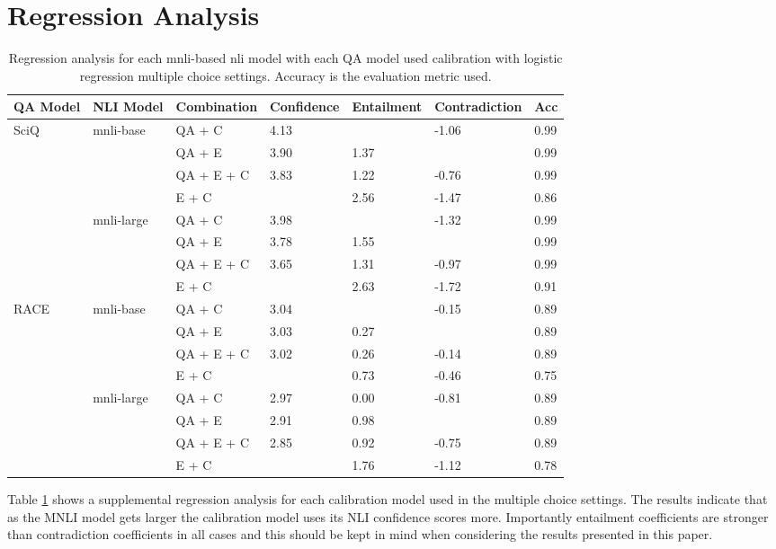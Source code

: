 \documentclass[11pt]{article}
\begin{document}
\section{Regression Analysis}
\begin{table}[]
\centering
\begin{tabular}{lllllll}
\hline
QA Model & NLI Model & Combination & Confidence & Entailment & Contradiction & Acc \\ \hline
SciQ & mnli-base & QA + C & 4.13 &  & -1.06 & 0.99 \\
 &  & QA + E & 3.90 & 1.37 &  & 0.99 \\
 &  & QA + E + C & 3.83 & 1.22 & -0.76 & 0.99 \\
 &  & E + C &  & 2.56 & -1.47 & 0.86 \\
 & mnli-large & QA + C & 3.98 &  & -1.32 & 0.99 \\
 &  & QA + E & 3.78 & 1.55 &  & 0.99 \\
 &  & QA + E + C & 3.65 & 1.31 & -0.97 & 0.99 \\
 &  & E + C &  & 2.63 & -1.72 & 0.91 \\
RACE & mnli-base & QA + C & 3.04 &  & -0.15 & 0.89 \\
 &  & QA + E & 3.03 & 0.27 &  & 0.89 \\
 &  & QA + E + C & 3.02 & 0.26 & -0.14 & 0.89 \\
 &  & E + C &  & 0.73 & -0.46 & 0.75 \\
 & mnli-large & QA + C & 2.97 & 0.00 & -0.81 & 0.89 \\
 &  & QA + E & 2.91 & 0.98 &  & 0.89 \\
 &  & QA + E + C & 2.85 & 0.92 & -0.75 & 0.89 \\
 &  & E + C &  & 1.76 & -1.12 & 0.78 \\ \hline
\end{tabular}
\caption{Regression analysis for each mnli-based nli model with each QA model used calibration with logistic regression multiple choice settings. Accuracy is the evaluation metric used.}
\label{tab:regression_analysis}
\end{table}
Table \ref{tab:regression_analysis} shows a supplemental regression analysis for each calibration model used in the multiple choice settings. The results indicate that as the MNLI model gets larger the calibration model uses its NLI confidence scores more. Importantly entailment coefficients are stronger than contradiction coefficients in all cases and this should be kept in mind when considering the results presented in this paper.
\end{document}

